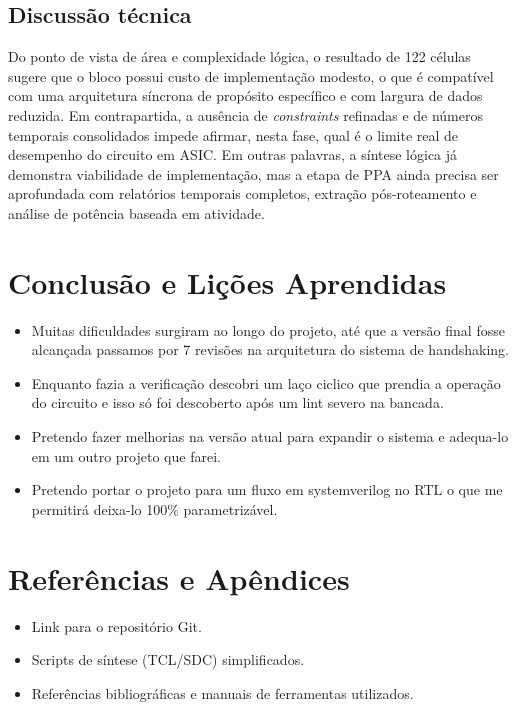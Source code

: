 \documentclass[12pt,a4paper]{article}
\begin{document}
	\subsection*{Discussão técnica}
	
	Do ponto de vista de área e complexidade lógica, o resultado de 122 células sugere que o bloco possui custo de implementação modesto, o que é compatível com uma arquitetura síncrona de propósito específico e com largura de dados reduzida. Em contrapartida, a ausência de \textit{constraints} refinadas e de números temporais consolidados impede afirmar, nesta fase, qual é o limite real de desempenho do circuito em ASIC. Em outras palavras, a síntese lógica já demonstra viabilidade de implementação, mas a etapa de PPA ainda precisa ser aprofundada com relatórios temporais completos, extração pós-roteamento e análise de potência baseada em atividade.
	
	\clearpage
	
	\section{Conclusão e Lições Aprendidas}
	
	\begin{itemize}[leftmargin=1.4em]
		\item Muitas dificuldades surgiram ao longo do projeto, até que a versão final fosse alcançada passamos por 7 revisões na arquitetura do sistema de handshaking.
		\item Enquanto fazia a verificação descobri um laço ciclico que prendia a operação do circuito e isso só foi descoberto após um lint severo na bancada.
		\item Pretendo fazer melhorias na versão atual para expandir o sistema e adequa-lo em um outro projeto que farei.
		\item Pretendo portar o projeto para um fluxo em systemverilog no RTL o que me permitirá deixa-lo 100\% parametrizável.
	\end{itemize}
	
	\clearpage
	
	\section{Referências e Apêndices}
	
	\begin{itemize}[leftmargin=1.4em]
		\item Link para o repositório Git.
		\item Scripts de síntese (TCL/SDC) simplificados.
		\item Referências bibliográficas e manuais de ferramentas utilizados.
	\end{itemize}
	
\end{document}
